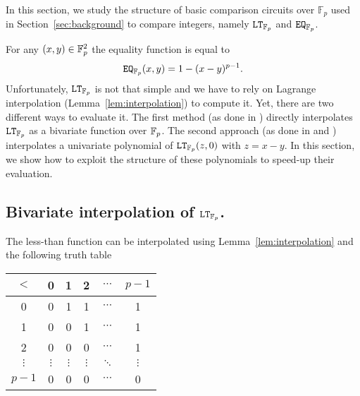 In this section, we study the structure of basic comparison circuits over $\mathbb{F}_p$ used in Section~\ref{sec:background} to compare integers, namely $\mathtt{LT}_{\mathbb{F}_p}$ and $\mathtt{EQ}_{\mathbb{F}_p}$. 

For any $(x,y)\in \mathbb{F}_p^2$ the equality function is equal to
\begin{align*}
  \mathtt{EQ}_{\mathbb{F}_p}(x,y) = 1 - (x-y)^{p-1}.
\end{align*}
Unfortunately, $\mathtt{LT}_{\mathbb{F}_p}$ is not that simple and we have to rely on Lagrange interpolation (Lemma~\ref{lem:interpolation}) to compute it. 
Yet, there are two different ways to evaluate it.
The first method (as done in \cite{TLWRK20}) directly interpolates $\mathtt{LT}_{\mathbb{F}_p}$ as a bivariate function over $\mathbb{F}_{p}$.
The second approach (as done in \cite{AINA:NGEG17} and \cite{PoPETS:SFR20}) interpolates a univariate polynomial of $\mathtt{LT}_{\mathbb{F}_p}(z, 0)$ with $z = x - y$.
In this section, we show how to exploit the structure of these polynomials to speed-up their evaluation.

\subsection{Bivariate interpolation of $\mathtt{LT}_{\mathbb{F}_p}$.}

  The less-than function can be interpolated using Lemma~\ref{lem:interpolation} and the following truth table
  \begin{table}
    \centering
    \begin{tabular}{c|ccccc}
        $<$ & 0 & 1 & 2 & $\cdots$ & $p-1$ \\
        \hline
        0 & 0 & 1 & 1 & $\cdots$ & 1 \\
        1 & 0 & 0 & 1 & $\cdots$ & 1 \\
        2 & 0 & 0 & 0 & $\cdots$ & 1 \\
        $\vdots$ & $\vdots$ & $\vdots$ & $\vdots$ & $\ddots$ & $\vdots$ \\
        $p-1$ & 0 & 0 & 0 & $\cdots$ & 0 \\
    \end{tabular}
  \end{table}
    
